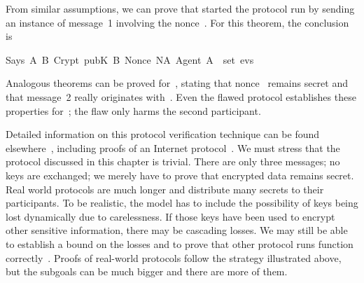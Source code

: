 \begin{isabellebody}
%
\endisadelimproof
%
\isatagproof
%
\endisatagproof
{\isafoldproof}%
%
\isadelimproof
%
\endisadelimproof
%
\begin{isamarkuptext}%
From similar assumptions, we can prove that  started the protocol
run by sending an instance of message~1 involving the nonce~\@. 
For this theorem, the conclusion is 
\begin{isabelle}%
Says\ A\ B\ {}Crypt\ {}pubK\ B{}\ {}Nonce\ NA{}\ Agent\ A{}{}\ {}\ set\ evs%
\end{isabelle}
Analogous theorems can be proved for~, stating that nonce~
remains secret and that message~2 really originates with~.  Even the
flawed protocol establishes these properties for~;
the flaw only harms the second participant.

\medskip

Detailed information on this protocol verification technique can be found
elsewhere~\cite{paulson-jcs}, including proofs of an Internet
protocol~\cite{paulson-tls}.  We must stress that the protocol discussed
in this chapter is trivial.  There are only three messages; no keys are
exchanged; we merely have to prove that encrypted data remains secret. 
Real world protocols are much longer and distribute many secrets to their
participants.  To be realistic, the model has to include the possibility
of keys being lost dynamically due to carelessness.  If those keys have
been used to encrypt other sensitive information, there may be cascading
losses.  We may still be able to establish a bound on the losses and to
prove that other protocol runs function
correctly~\cite{paulson-yahalom}.  Proofs of real-world protocols follow
the strategy illustrated above, but the subgoals can
be much bigger and there are more of them.
%
\end{isamarkuptext}%
\isamarkuptrue%
%
\isadelimtheory
%
\endisadelimtheory
%
\isatagtheory
%
\endisatagtheory
{\isafoldtheory}%
%
\isadelimtheory
%
\endisadelimtheory
\end{isabellebody}%

